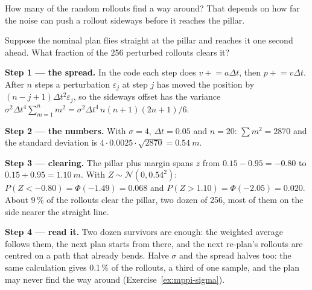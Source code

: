

How many of the random rollouts find a way around? That depends on how far the noise can push a rollout sideways before it reaches the pillar.

\begin{example}
\label{ex:mppi-odds}
Suppose the nominal plan flies straight at the pillar and reaches it one second ahead. What fraction of the 256 perturbed rollouts clears it?

\textbf{Step 1 — the spread.} In the code each step does $v \mathrel{+}= a\Delta t$, then $p \mathrel{+}= v\Delta t$. After $n$ steps a perturbation $\varepsilon_j$ at step $j$ has moved the position by $(n - j + 1)\Delta t^2\varepsilon_j$, so the sideways offset has the variance $\sigma^2\Delta t^4\sum_{m=1}^{n}m^2 = \sigma^2\Delta t^4\,n(n+1)(2n+1)/6$.

\textbf{Step 2 — the numbers.} With $\sigma = 4$, $\Delta t = 0.05$ and $n = 20$: $\sum m^2 = 2870$ and the standard deviation is $4 \cdot 0.0025 \cdot \sqrt{2870} = \SI{0.54}{m}$.

\textbf{Step 3 — clearing.} The pillar plus margin spans $z$ from $0.15 - 0.95 = -0.80$ to $0.15 + 0.95 = \SI{1.10}{m}$. With $Z \sim \mathcal N(0, 0.54^2)$: $P(Z < -0.80) = \Phi(-1.49) = 0.068$ and $P(Z > 1.10) = \Phi(-2.05) = 0.020$. About 9\,\% of the rollouts clear the pillar, two dozen of 256, most of them on the side nearer the straight line.

\textbf{Step 4 — read it.} Two dozen survivors are enough: the weighted average follows them, the next plan starts from there, and the next re-plan's rollouts are centred on a path that already bends. Halve $\sigma$ and the spread halves too: the same calculation gives 0.1\,\% of the rollouts, a third of one sample, and the plan may never find the way around (Exercise~\ref{ex:mppi-sigma}).
\end{example}

